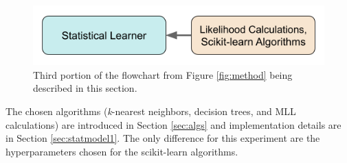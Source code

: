
\begin{figure}[H]
  \centering
  \includegraphics[width=0.7\linewidth]{./chapters/exp1/methodology3.png}
  \caption{Third portion of the flowchart from Figure \ref{fig:method} being 
           described in this section.}
\end{figure}

The chosen algorithms (\textit{k}-nearest neighbors, decision trees, and
\gls{MLL} calculations) are introduced in Section \ref{sec:algs} and
implementation details are in Section \ref{sec:statmodel1}. The only
difference for this experiment are the hyperparameters chosen for the
scikit-learn algorithms.



